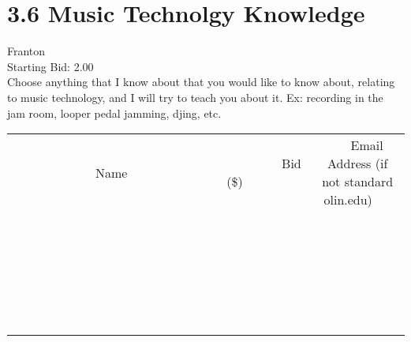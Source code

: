 \documentclass[11pt]{article}
\begin{document}
					\section*{3.6 Music Technolgy Knowledge}
					Franton \\
					Starting Bid: 2.00 \\
					Choose anything that I know about that you would like to know about, relating to music technology, and I will try to teach you about it. Ex: recording in the jam room, looper pedal jamming, djing, etc. \\
					[6ex]
					\begin{tabular}{c c c}
						~~~~~~~~~~~~~Name~~~~~~~~~~~~~ & ~~~~~~~~~Bid (\$)~~~~~~~~~ & ~~~Email Address (if not standard olin.edu)~~~ \\
				
 & & \\
\hline
 & & \\
\hline
 & & \\
\hline
 & & \\
\hline
 & & \\
\hline
 & & \\
\hline
 & & \\
\hline
 & & \\
\hline
 & & \\
\hline
 & & \\
\hline
 & & \\
\hline
 & & \\
\hline
 & & \\
\hline
 & & \\
\hline
 & & \\
\hline
 & & \\
\hline
 & & \\
\hline
 & & \\
\hline
 & & \\
\hline
 & & \\
\hline
 & & \\
\hline
 & & \\
\hline
 & & \\
\hline
 & & \\
\hline
 & & \\
\hline
 & & \\
\hline
					\end{tabular}
					\clearpage
				
\end{document}
